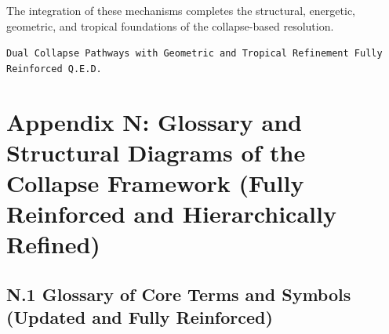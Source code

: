 \documentclass[11pt]{article}
\begin{document}
The integration of these mechanisms completes the structural, energetic, geometric, and tropical foundations of the collapse-based resolution.

\begin{flushright}
\texttt{Dual Collapse Pathways with Geometric and Tropical Refinement \quad Fully Reinforced \quad Q.E.D.}
\end{flushright}



\section*{Appendix N: Glossary and Structural Diagrams of the Collapse Framework (Fully Reinforced and Hierarchically Refined)}

\subsection*{N.1 Glossary of Core Terms and Symbols (Updated and Fully Reinforced)}
\end{document}

